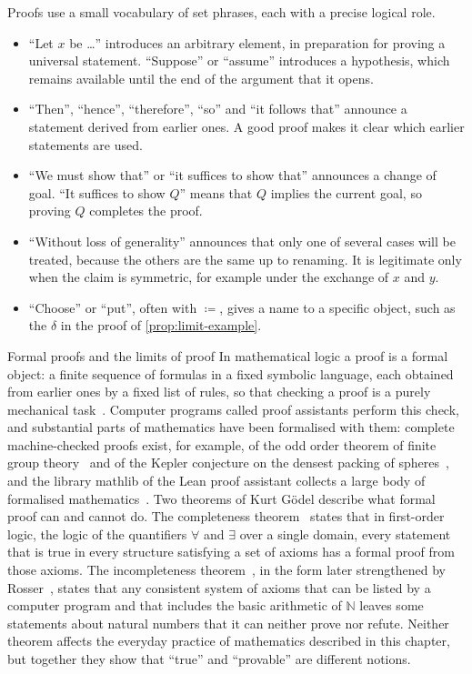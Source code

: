 Proofs use a small vocabulary of set phrases, each with a precise logical role.
\begin{itemize}
\item ``Let $x$ be \ldots'' introduces an arbitrary element, in preparation for proving a universal statement. ``Suppose'' or ``assume'' introduces a hypothesis, which remains available until the end of the argument that it opens.
\item ``Then'', ``hence'', ``therefore'', ``so'' and ``it follows that'' announce a statement derived from earlier ones. A good proof makes it clear which earlier statements are used.
\item ``We must show that'' or ``it suffices to show that'' announces a change of goal. ``It suffices to show $Q$'' means that $Q$ implies the current goal, so proving $Q$ completes the proof.
\item ``Without loss of generality'' announces that only one of several cases will be treated, because the others are the same up to renaming. It is legitimate only when the claim is symmetric, for example under the exchange of $x$ and $y$.
\item ``Choose'' or ``put'', often with $\coloneqq$, gives a name to a specific object, such as the $\delta$ in the proof of \cref{prop:limit-example}.
\end{itemize}

\begin{note}{Formal proofs and the limits of proof}
In mathematical logic a proof is a formal object: a finite sequence of formulas in a fixed symbolic language, each obtained from earlier ones by a fixed list of rules, so that checking a proof is a purely mechanical task~\cite{enderton2001}. Computer programs called proof assistants perform this check, and substantial parts of mathematics have been formalised with them: complete machine-checked proofs exist, for example, of the odd order theorem of finite group theory~\cite{gonthier2013oddorder} and of the Kepler conjecture on the densest packing of spheres~\cite{hales2017kepler}, and the library mathlib of the Lean proof assistant collects a large body of formalised mathematics~\cite{mathlib2020}. Two theorems of Kurt G\"odel describe what formal proof can and cannot do. The completeness theorem~\cite{godel1930} states that in first-order logic, the logic of the quantifiers $\forall$ and $\exists$ over a single domain, every statement that is true in every structure satisfying a set of axioms has a formal proof from those axioms. The incompleteness theorem~\cite{godel1931}, in the form later strengthened by Rosser~\cite{rosser1936}, states that any consistent system of axioms that can be listed by a computer program and that includes the basic arithmetic of $\mathbb N$ leaves some statements about natural numbers that it can neither prove nor refute. Neither theorem affects the everyday practice of mathematics described in this chapter, but together they show that ``true'' and ``provable'' are different notions.
\end{note}

